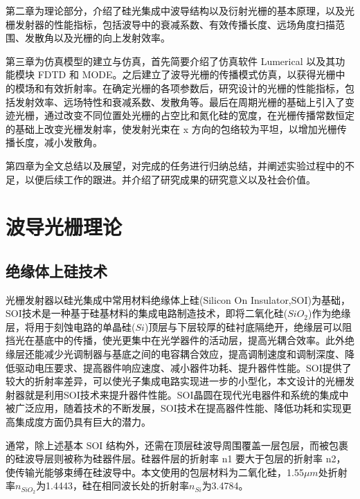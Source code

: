 \documentclass[UTF8,a4paper,12pt]{ctexart}
\numberwithin{equation}{section}
\begin{document}
第二章为理论部分，介绍了硅光集成中波导结构以及衍射光栅的基本原理，以及光栅发射器的性能指标，包括波导中的衰减系数、有效传播长度、远场角度扫描范围、发散角以及光栅的向上发射效率。

第三章为仿真模型的建立与仿真，首先简要介绍了仿真软件 Lumerical 以及其功能模块 FDTD 和 MODE。之后建立了波导光栅的传播模式仿真，以获得光栅中的模场和有效折射率。在确定光栅的各项参数后，研究设计的光栅的性能指标，包括发射效率、远场特性和衰减系数、发散角等。最后在周期光栅的基础上引入了变迹光栅，通过改变不同位置处光栅的占空比和氮化硅的宽度，在光栅传播常数恒定的基础上改变光栅发射率，使发射光束在 x 方向的包络较为平坦，以增加光栅传播长度，减小发散角。

第四章为全文总结以及展望，对完成的任务进行归纳总结，并阐述实验过程中的不足，以便后续工作的跟进。并介绍了研究成果的研究意义以及社会价值。
















\newpage
{}
\section{波导光栅理论}
\subsection{绝缘体上硅技术}
光栅发射器以硅光集成中常用材料绝缘体上硅(Silicon On Insulator,SOI)为基础，SOI技术是一种基于硅基材料的集成电路制造技术，即将二氧化硅($SiO_2$)作为绝缘层，将用于刻蚀电路的单晶硅($Si$)顶层与下层较厚的硅衬底隔绝开，绝缘层可以阻挡光在基底中的传播，使光更集中在光学器件的活动层，提高光耦合效率。此外绝缘层还能减少光调制器与基底之间的电容耦合效应，提高调制速度和调制深度、降低驱动电压要求、提高器件响应速度、减小器件功耗、提升器件性能。SOI提供了较大的折射率差异，可以使光子集成电路实现进一步的小型化，本文设计的光栅发射器就是利用SOI技术来提升器件性能。SOI晶圆在现代光电器件和系统的集成中被广泛应用，随着技术的不断发展，SOI技术在提高器件性能、降低功耗和实现更高集成度方面仍具有巨大的潜力。

通常，除上述基本 SOI 结构外，还需在顶层硅波导周围覆盖一层包层，而被包裹的硅波导层则被称为硅器件层。硅器件层的折射率 n1 要大于包层的折射率 n2，使传输光能够束缚在硅波导中。本文使用的包层材料为二氧化硅，1.55$\mu m$处折射率$n_{SiO_2}$为1.4443，硅在相同波长处的折射率$n_{Si}$为3.4784。
\end{document}
